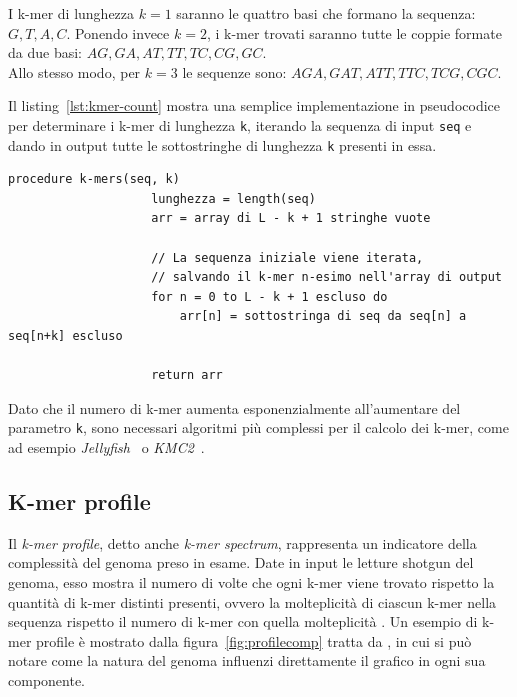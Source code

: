 \documentclass[crop=false, class=book]{standalone}
\begin{document}
	I k-mer di lunghezza $k=1$ saranno le quattro basi che formano la sequenza: $G, T, A, C$. Ponendo invece $k=2$, i k-mer trovati saranno tutte le coppie formate da due basi: $AG, GA, AT, TT, TC, CG, GC$. \\
	\noindent
	Allo stesso modo, per $k=3$ le sequenze sono: $AGA, GAT, ATT, TTC, TCG, CGC$.

	Il listing~\vref{lst:kmer-count} mostra una semplice implementazione in pseudocodice per determinare i k-mer di lunghezza \verb|k|, iterando la sequenza di input \verb|seq| e dando in output tutte le sottostringhe di lunghezza \verb|k| presenti in essa.
	
	\begin{center}
		\begin{minipage}{0.95\textwidth}
			\begin{lstlisting}[caption={Algoritmo in pseudocodice per la costruzione dei k-mer.}, label={lst:kmer-count}, language=pseudocode]
				procedure k-mers(seq, k)
					lunghezza = length(seq)
					arr = array di L - k + 1 stringhe vuote
						
					// La sequenza iniziale viene iterata, 
					// salvando il k-mer n-esimo nell'array di output
					for n = 0 to L - k + 1 escluso do 
						arr[n] = sottostringa di seq da seq[n] a seq[n+k] escluso
					
					return arr
			\end{lstlisting}
		\end{minipage}
	\end{center}
		
	Dato che il numero di k-mer aumenta esponenzialmente all'aumentare del parametro \verb|k|, sono necessari algoritmi più complessi per il calcolo dei k-mer, come ad esempio \textit{Jellyfish}~\cite{marcais2011fast} o \textit{KMC2}~\cite{deorowicz2015KMC}.
	
	\subsection{K-mer profile}
	\label{subsec:kmerprofile}
	Il \textit{k-mer profile}, detto anche \textit{k-mer spectrum}, rappresenta un indicatore della complessità del genoma preso in esame. Date in input le letture shotgun del genoma, esso mostra il numero di volte che ogni k-mer viene trovato rispetto la quantità di k-mer distinti presenti, ovvero la molteplicità di ciascun k-mer nella sequenza rispetto il numero di k-mer con quella molteplicità \cite{mapleson2017kat}. Un esempio di k-mer profile è mostrato dalla figura~\vref{fig:profilecomp} tratta da \cite{sohn2016present}, in cui si può notare come la natura del genoma influenzi direttamente il grafico in ogni sua componente. 
\end{document}
